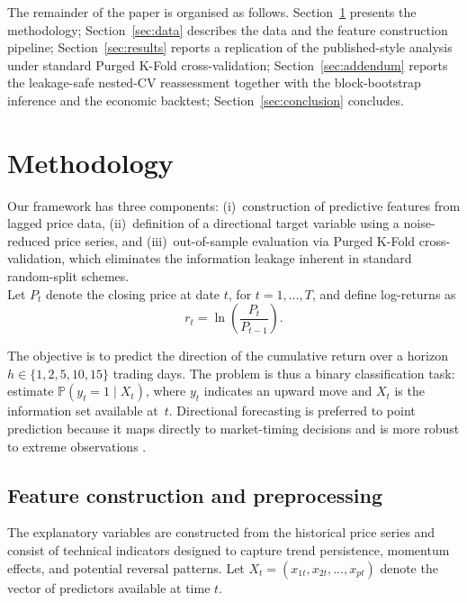 \documentclass{rQUF2e}
\begin{document}
\noindent The remainder of the paper is organised as follows.
Section~\ref{sec:methodology} presents the methodology;
Section~\ref{sec:data} describes the data and the feature
construction pipeline; Section~\ref{sec:results} reports a
replication of the published-style analysis under standard Purged
K-Fold cross-validation; Section~\ref{sec:addendum} reports the
leakage-safe nested-CV reassessment together with the block-bootstrap
inference and the economic backtest; Section~\ref{sec:conclusion}
concludes.



\section{Methodology}
\label{sec:methodology}

Our framework has three components: (i)~construction of predictive features from lagged price data, (ii)~definition of a directional target variable using a noise-reduced price series, and (iii)~out-of-sample evaluation via Purged K-Fold cross-validation, which eliminates the information leakage inherent in standard random-split schemes. \\

\noindent Let \(P_t\) denote the closing price at date \(t\), for \(t=1,\dots,T\), and define log-returns as
\begin{equation}
r_t = \ln\left(\frac{P_t}{P_{t-1}}\right).
\end{equation}

\noindent The objective is to predict the direction of the cumulative return over a horizon \(h \in \{1,2,5,10,15\}\) trading days. The problem is thus a binary classification task: estimate $\mathbb{P}(y_t=1\mid X_t)$, where $y_t$ indicates an upward move and $X_t$ is the information set available at~$t$. Directional forecasting is preferred to point prediction because it maps directly to market-timing decisions and is more robust to extreme observations \citep{fischer2018deep,gu2020empirical}.

\subsection{Feature construction and preprocessing}

The explanatory variables are constructed from the historical price series and consist of technical indicators designed to capture trend persistence, momentum effects, and potential reversal patterns. Let
$X_t = (x_{1t},x_{2t},\dots,x_{pt})$
denote the vector of predictors available at time \(t\). \\
\end{document}
